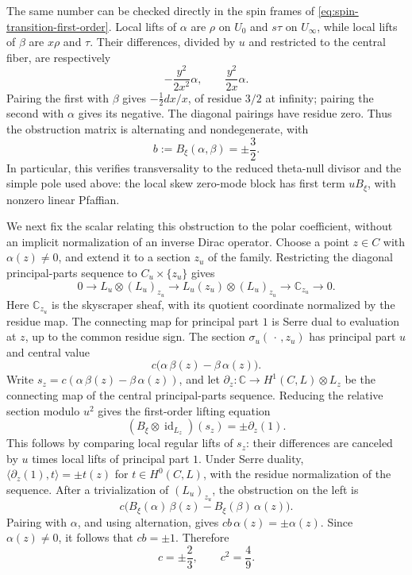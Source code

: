 \documentclass[11pt]{article}
\begin{document}
The same number can be checked directly in the spin frames of
\eqref{eq:spin-transition-first-order}. Local lifts of $\alpha$ are
$\rho$ on $U_0$ and $s\tau$ on $U_\infty$, while local lifts of
$\beta$ are $x\rho$ and $\tau$. Their differences, divided by $u$
and restricted to the central fiber, are respectively
\[
-\frac{y^2}{2x^2}\alpha,
\qquad \frac{y^2}{2x}\alpha.
\]
Pairing the first with $\beta$ gives $-\tfrac12dx/x$, of residue
$3/2$ at infinity; pairing the second with $\alpha$ gives its
negative. The diagonal pairings have residue zero. Thus the
obstruction matrix is alternating and nondegenerate, with
\[
b:=B_\xi(\alpha,\beta)=\pm\frac32.
\]
In particular, this verifies transversality to the reduced theta-null
divisor and the simple pole used above: the local skew zero-mode
block has first term $uB_\xi$, with nonzero linear Pfaffian.

\begingroup
We next fix the scalar relating this obstruction to the polar
coefficient, without an implicit normalization of an inverse Dirac
operator. Choose a point $z\in C$ with $\alpha(z)\neq0$, and extend
it to a section $z_u$ of the family. Restricting the diagonal
principal-parts sequence to $C_u\times\{z_u\}$ gives
\[
0\longrightarrow L_u\otimes(L_u)_{z_u}
\longrightarrow L_u(z_u)\otimes(L_u)_{z_u}
\longrightarrow\mathbb C_{z_u}\longrightarrow0.
\]
Here $\mathbb C_{z_u}$ is the skyscraper sheaf, with its quotient
coordinate normalized by the residue map. The connecting map for
principal part $1$ is Serre dual to evaluation at $z$, up to the
common residue sign. The section $\sigma_u(\,\cdot\,,z_u)$ has
principal part $u$ and central value
\[
c\bigl(\alpha\,\beta(z)-\beta\,\alpha(z)\bigr).
\]
Write $s_z=c(\alpha\,\beta(z)-\beta\,\alpha(z))$, and let
$\partial_z:\mathbb C\to H^1(C,L)\otimes L_z$ be the connecting map
of the central principal-parts sequence. Reducing the relative section
modulo $u^2$ gives the first-order lifting equation
\[
(B_\xi\otimes\operatorname{id}_{L_z})(s_z)=\pm\partial_z(1).
\]
This follows by comparing local regular lifts of $s_z$: their
differences are canceled by $u$ times local lifts of principal part $1$.
Under Serre duality, $\langle\partial_z(1),t\rangle=\pm t(z)$
for $t\in H^0(C,L)$, with the residue normalization of the sequence.
After a trivialization of $(L_u)_{z_u}$, the obstruction on the left is
\[
c\bigl(B_\xi(\alpha)\,\beta(z)
-B_\xi(\beta)\,\alpha(z)\bigr).
\]
Pairing with $\alpha$, and using alternation, gives
$cb\,\alpha(z)=\pm\alpha(z)$. Since $\alpha(z)\neq0$, it follows
that $cb=\pm1$. Therefore
\begin{equation}
\label{eq:c-value}
c=\pm\frac23,\qquad c^2=\frac49.
\end{equation}
\endgroup
\end{document}
